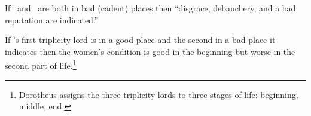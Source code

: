 If \Jupiter\, and \Venus\, are both in bad (cadent) places  then ``disgrace, debauchery, and a bad reputation are indicated.''

If \Venus's first triplicity lord is in a good place and the second in a bad place it indicates then the women's condition is good in the beginning but worse in the second part of life.\footnote{Dorotheus assigns the three triplicity lords to three stages of life: beginning, middle, end.}





